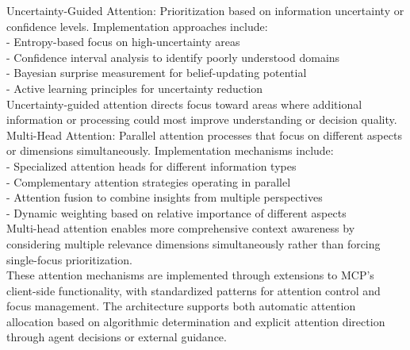 Uncertainty-Guided Attention: Prioritization based on information uncertainty or confidence levels. Implementation approaches include:\\ \newline
- Entropy-based focus on high-uncertainty areas\\ \newline
- Confidence interval analysis to identify poorly understood domains\\ \newline
- Bayesian surprise measurement for belief-updating potential\\ \newline
- Active learning principles for uncertainty reduction\\ \newline
Uncertainty-guided attention directs focus toward areas where additional information or processing could most improve understanding or decision quality.\\ \newline
Multi-Head Attention: Parallel attention processes that focus on different aspects or dimensions simultaneously. Implementation mechanisms include:\\ \newline
- Specialized attention heads for different information types\\ \newline
- Complementary attention strategies operating in parallel\\ \newline
- Attention fusion to combine insights from multiple perspectives\\ \newline
- Dynamic weighting based on relative importance of different aspects\\ \newline
Multi-head attention enables more comprehensive context awareness by considering multiple relevance dimensions simultaneously rather than forcing single-focus prioritization.\\ \newline
These attention mechanisms are implemented through extensions to MCP's client-side functionality, with standardized patterns for attention control and focus management. The architecture supports both automatic attention allocation based on algorithmic determination and explicit attention direction through agent decisions or external guidance.\\
